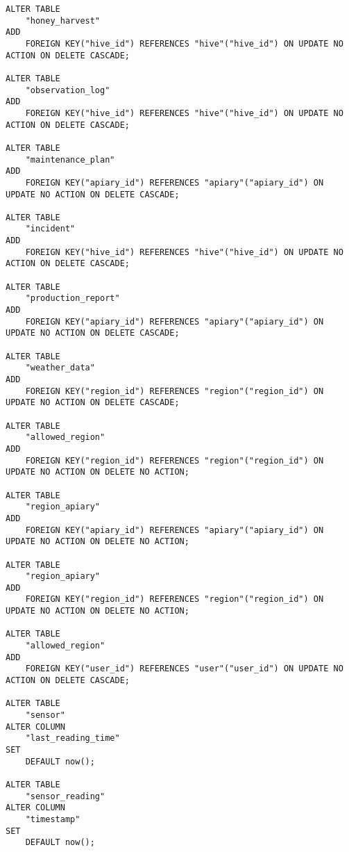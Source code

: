 \documentclass{article}
\begin{document}
\begin{lstlisting}
ALTER TABLE
	"honey_harvest"
ADD
	FOREIGN KEY("hive_id") REFERENCES "hive"("hive_id") ON UPDATE NO ACTION ON DELETE CASCADE;

ALTER TABLE
	"observation_log"
ADD
	FOREIGN KEY("hive_id") REFERENCES "hive"("hive_id") ON UPDATE NO ACTION ON DELETE CASCADE;

ALTER TABLE
	"maintenance_plan"
ADD
	FOREIGN KEY("apiary_id") REFERENCES "apiary"("apiary_id") ON UPDATE NO ACTION ON DELETE CASCADE;

ALTER TABLE
	"incident"
ADD
	FOREIGN KEY("hive_id") REFERENCES "hive"("hive_id") ON UPDATE NO ACTION ON DELETE CASCADE;

ALTER TABLE
	"production_report"
ADD
	FOREIGN KEY("apiary_id") REFERENCES "apiary"("apiary_id") ON UPDATE NO ACTION ON DELETE CASCADE;

ALTER TABLE
	"weather_data"
ADD
	FOREIGN KEY("region_id") REFERENCES "region"("region_id") ON UPDATE NO ACTION ON DELETE CASCADE;

ALTER TABLE
	"allowed_region"
ADD
	FOREIGN KEY("region_id") REFERENCES "region"("region_id") ON UPDATE NO ACTION ON DELETE NO ACTION;

ALTER TABLE
	"region_apiary"
ADD
	FOREIGN KEY("apiary_id") REFERENCES "apiary"("apiary_id") ON UPDATE NO ACTION ON DELETE NO ACTION;

ALTER TABLE
	"region_apiary"
ADD
	FOREIGN KEY("region_id") REFERENCES "region"("region_id") ON UPDATE NO ACTION ON DELETE NO ACTION;

ALTER TABLE
	"allowed_region"
ADD
	FOREIGN KEY("user_id") REFERENCES "user"("user_id") ON UPDATE NO ACTION ON DELETE CASCADE;

ALTER TABLE
	"sensor"
ALTER COLUMN
	"last_reading_time"
SET
	DEFAULT now();

ALTER TABLE
	"sensor_reading"
ALTER COLUMN
	"timestamp"
SET
	DEFAULT now();
\end{lstlisting}
\end{document}
